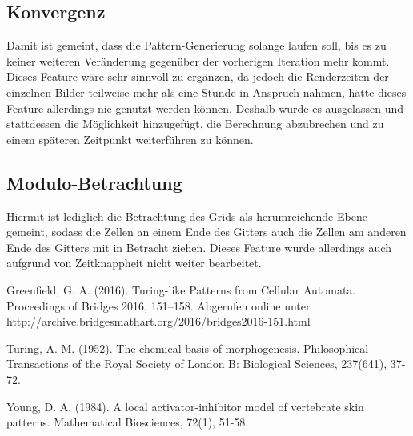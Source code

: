 \documentclass[]{article}
\begin{document}
\subsection{Konvergenz}
Damit ist gemeint, dass die Pattern-Generierung solange laufen soll, bis es zu keiner weiteren Ver\"anderung gegen\"uber der vorherigen Iteration mehr kommt.
Dieses Feature w\"are sehr sinnvoll zu erg\"anzen, da jedoch die Renderzeiten der einzelnen Bilder teilweise mehr als eine Stunde in Anspruch nahmen, h\"atte dieses Feature allerdings nie genutzt werden k\"onnen. Deshalb wurde es ausgelassen und stattdessen die M\"oglichkeit hinzugef\"ugt, die Berechnung abzubrechen und zu einem sp\"ateren Zeitpunkt weiterf\"uhren zu k\"onnen.

\subsection{Modulo-Betrachtung}
Hiermit ist lediglich die Betrachtung des Grids als herumreichende Ebene gemeint, sodass die Zellen an einem Ende des Gitters auch die Zellen am anderen Ende des Gitters mit in Betracht ziehen.
Dieses Feature wurde allerdings auch aufgrund von Zeitknappheit nicht weiter bearbeitet.

\begin{thebibliography}{9}
	
	Greenfield, G. A. (2016). Turing-like Patterns from Cellular Automata. Proceedings of Bridges 2016, 151–158. 
	Abgerufen online unter http://archive.bridgesmathart.org/2016/bridges2016-151.html
	
	Turing, A. M. (1952). The chemical basis of morphogenesis. Philosophical Transactions of the Royal Society of London B: Biological Sciences, 237(641), 37-72.
	
		Young, D. A. (1984). A local activator-inhibitor model of vertebrate skin patterns. Mathematical Biosciences, 72(1), 51-58.
	
\end{thebibliography}
\end{document}
